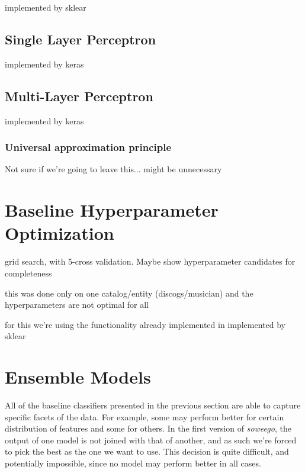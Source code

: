 \documentclass[epsfig,a4paper,11pt,titlepage,twoside,openany]{book}
\begin{document}
implemented by sklear \cite{scikit-learn}

\subsection{Single Layer Perceptron}
\label{sec:clf-slp}

implemented by keras \cite{chollet2015keras}

\subsection{Multi-Layer Perceptron}
\label{sec:clf-mlp}

implemented by keras \cite{chollet2015keras}

\subsubsection{Universal approximation principle}
\label{sec:universal-apprx-principle}

Not sure if we're going to leave this... might be unnecessary

\section{Baseline Hyperparameter Optimization}
\label{sec:hyperpar-optimization}

grid search, with 5-cross validation. Maybe show hyperparameter candidates for
completeness

this was done only on one catalog/entity (discogs/musician) and the
hyperparameters are not optimal for all

for this we're using the functionality already implemented in implemented by sklear \cite{scikit-learn}


\section{Ensemble Models}
\label{sec:ensemble-models}

All of the baseline classifiers presented in the previous section are able to capture specific facets of the data. For example, some may perform better for certain distribution of features and some for others. In the first version of \textit{soweego}, the output of one model is not joined with that of another, and as such we're forced to pick the best as the one we want to use. This decision is quite difficult, and potentially impossible, since no model may perform better in all cases. 
\end{document}
